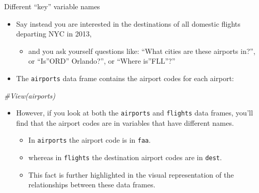\documentclass[
  ignorenonframetext,
]{beamer}
\newenvironment{Shaded}{\begin{snugshade}}{\end{snugshade}}
\newcommand{\CommentTok}[1]{\textcolor[rgb]{0.56,0.35,0.01}{\textit{#1}}}
\providecommand{\tightlist}{%
  \setlength{\itemsep}{0pt}\setlength{\parskip}{0pt}}
\begin{document}
\begin{frame}[fragile]{Different ``key'' variable names}
\protect\hypertarget{different-key-variable-names}{}
\begin{itemize}
\item
  Say instead you are interested in the destinations of all domestic
  flights departing NYC in 2013,

  \begin{itemize}
  \tightlist
  \item
    and you ask yourself questions like: ``What cities are these
    airports in?'', or ``Is''ORD'' Orlando?'', or ``Where is''FLL''?''
  \end{itemize}
\item
  The \texttt{airports} data frame contains the airport codes for each
  airport:
\end{itemize}

\small

\begin{Shaded}
\begin{Highlighting}[]
\CommentTok{\#View(airports)}
\end{Highlighting}
\end{Shaded}

\normalsize

\begin{itemize}
\item
  However, if you look at both the \texttt{airports} and
  \texttt{flights} data frames, you'll find that the airport codes are
  in variables that have different names.

  \begin{itemize}
  \tightlist
  \item
    In \texttt{airports} the airport code is in \texttt{faa}.
  \item
    whereas in \texttt{flights} the destination airport codes are in
    \texttt{dest}.
  \item
    This fact is further highlighted in the visual representation of the
    relationships between these data frames.
  \end{itemize}
\end{itemize}
\end{frame}
\end{document}
